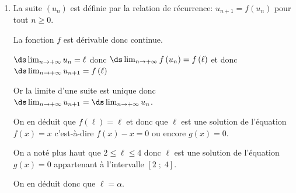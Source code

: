 \begin{enumerate}
Donc, d'après le corollaire du théorème des valeurs intermédiaires, on peut conclure que l'équation $g(x)=0$ admet une solution unique dans l'intervalle $[2\;;\;4]$.

On appelle $\alpha$ cette solution. À la calculatrice on trouve $\alpha\approx 3,78$.


\item%
La suite $(u_n)$ est définie par la relation de récurrence: $u_{n+1}=f\left (u_n\right )$ pour tout $n\geqslant 0$.

La fonction $f$ est dérivable donc continue.

$\ds\lim_{n\to +\infty} u_n=\ell$ donc $\ds\lim_{n\to +\infty} f\left (u_n\right )=f\left (\ell\right )$ et donc $\ds\lim_{n\to +\infty} u_{n+1}=f\left (\ell\right )$

Or la limite d'une suite est unique donc $\ds\lim_{n\to +\infty} u_{n+1}= \ds\lim_{n\to +\infty} u_{n}$.

On en déduit que $f\left (\ell\right ) = \ell$ et donc que $\ell$ est une solution de l'équation $f(x)=x$ c'est-à-dire $f(x)-x=0$ ou encore $g(x)=0$.

On a noté plus haut que $2 \leqslant \ell \leqslant 4$ donc $\ell$ est une solution de l'équation $g(x)=0$ appartenant à l'intervalle $[2\;;\;4]$.

On en déduit donc que $\ell=\alpha$.

\end{enumerate}

\bigskip
